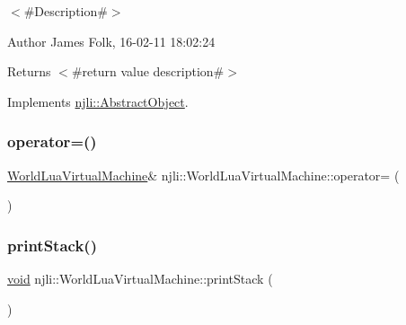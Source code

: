 $<$\#\+Description\#$>$ 

\begin{DoxyAuthor}{Author}
James Folk, 16-\/02-\/11 18\+:02\+:24
\end{DoxyAuthor}
\begin{DoxyReturn}{Returns}
$<$\#return value description\#$>$ 
\end{DoxyReturn}


Implements \mbox{\hyperlink{classnjli_1_1_abstract_object_afc07f4138bd3003910e7aa7fa0fe11ad}{njli\+::\+Abstract\+Object}}.

\mbox{\label{classnjli_1_1_world_lua_virtual_machine_aad84aef1b87d168be779005926e412d7}} 
\subsubsection{\texorpdfstring{operator=()}{operator=()}}
{\footnotesize\ttfamily \mbox{\hyperlink{classnjli_1_1_world_lua_virtual_machine}{World\+Lua\+Virtual\+Machine}}\& njli\+::\+World\+Lua\+Virtual\+Machine\+::operator= (\begin{DoxyParamCaption}\item[{const \mbox{\hyperlink{classnjli_1_1_world_lua_virtual_machine}{World\+Lua\+Virtual\+Machine}} \&}]{ }\end{DoxyParamCaption})\hspace{0.3cm}{\ttfamily [private]}}

\mbox{\label{classnjli_1_1_world_lua_virtual_machine_a64ad43f3f5c5ce88f83a399116be7851}} 
\subsubsection{\texorpdfstring{print\+Stack()}{printStack()}}
{\footnotesize\ttfamily \mbox{\hyperlink{_thread_8h_af1e856da2e658414cb2456cb6f7ebc66}{void}} njli\+::\+World\+Lua\+Virtual\+Machine\+::print\+Stack (\begin{DoxyParamCaption}{ }\end{DoxyParamCaption})}



